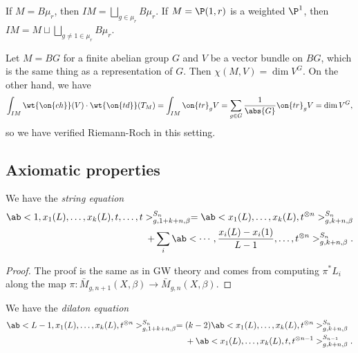 \begin{exm}
    If \(M = B\mu_r\), then \(IM = \bigsqcup_{g \in \mu_r} B \mu_r\). If \(M = \P(1, r)\) is a weighted \(\P^1\), then \(IM = M \sqcup \bigsqcup_{g \neq 1 \in \mu_r} B\mu_r\).    
\end{exm}

\begin{exm}
    Let \(M = BG\) for a finite abelian group \(G\) and \(V\) be a vector bundle on \(BG\), which is the same thing as a representation of \(G\). Then \(\chi(M, V) = \dim V^G\). On the other hand, we have
    \[ \int_{IM} \wt{\on{ch}}(V) \cdot \wt{\on{td}}(T_M) = \int_{IM} \on{tr}_g V = \sum_{g \in G} \frac{1}{\abs{G}} \on{tr}_g V = \dim V^G, \]
    so we have verified Riemann-Roch in this setting.
\end{exm}

\subsection{Axiomatic properties}%
\label{sub:Axiomatic properties}

\begin{lem}
    We have the \textit{string equation}
    \begin{align*}
        \ab< 1, x_1(L), \ldots, x_k(L), t, \ldots, t >_{g, 1+k+n, \beta}^{S_n} = \ab<x_1(L), \ldots, x_k(L), t^{\otimes n}>^{S_n}_{g,k+n,\beta} \\
        + \sum_i \ab< \cdots, \frac{x_i(L) - x_i(1)}{L-1}, \ldots, t^{\otimes n}>^{S_n}_{g,k+n,\beta}. 
    \end{align*}
\end{lem}

\begin{proof}
    The proof is the same as in GW theory and comes from computing \(\pi^* L_i\) along the map \(\pi \colon\bar{M}_{g,n+1}(X,\beta) \to \bar{M}_{g,n}(X,\beta)\).
\end{proof}

\begin{lem}
    We have the \textit{dilaton equation}
    \begin{align*}
        \ab<L-1, x_1(L), \ldots, x_k(L), t^{\otimes n}>_{g,1+k+n,\beta}^{S_n} ={}& (k-2)\ab<x_1(L), \ldots, x_k(L), t^{\otimes n}>_{g,k+n,\beta}^{S_n} \\
        &+ \ab<x_1(L), \ldots, x_k(L), t, t^{\otimes n-1}>_{g,k+n,\beta}^{S_{n-1}}.
    \end{align*}
\end{lem}

